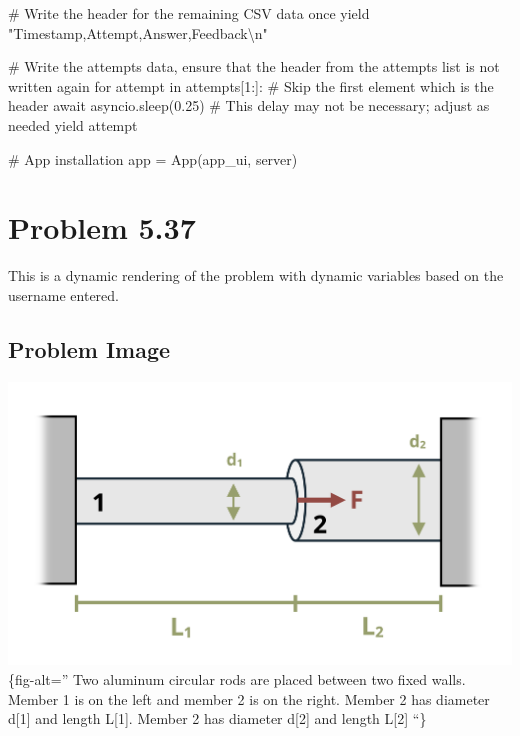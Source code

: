\documentclass[
  letterpaper,
  DIV=11,
  numbers=noendperiod]{scrreprt}
\newenvironment{Shaded}{\begin{snugshade}}{\end{snugshade}}
\newcommand{\NormalTok}[1]{\textcolor[rgb]{0.00,0.23,0.31}{#1}}
\begin{document}
\begin{Shaded}
\begin{Highlighting}[]
\NormalTok{        \# Write the header for the remaining CSV data once}
\NormalTok{        yield "Timestamp,Attempt,Answer,Feedback\textbackslash{}n"}
        
\NormalTok{        \# Write the attempts data, ensure that the header from the attempts list is not written again}
\NormalTok{        for attempt in attempts[1:]:  \# Skip the first element which is the header}
\NormalTok{            await asyncio.sleep(0.25)  \# This delay may not be necessary; adjust as needed}
\NormalTok{            yield attempt}


\NormalTok{\# App installation}
\NormalTok{app = App(app\_ui, server)}
\end{Highlighting}
\end{Shaded}

\chapter*{Problem 5.37}\label{problem-5.37}


This is a dynamic rendering of the problem with dynamic variables based
on the username entered.

\section*{Problem Image}\label{problem-image-50}


\includegraphics{images/247.png}\{fig-alt='' Two aluminum circular rods
are placed between two fixed walls. Member 1 is on the left and member 2
is on the right. Member 2 has diameter d{[}1{]} and length L{[}1{]}.
Member 2 has diameter d{[}2{]} and length L{[}2{]} ``\}
\end{document}
